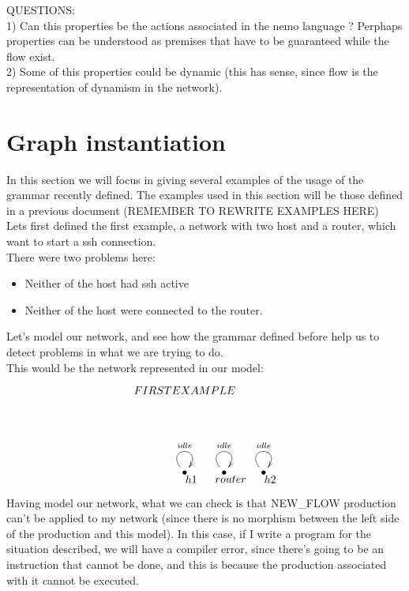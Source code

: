 \documentclass[envcountsect,runningheads]{llncs}
\begin{document}
\begin{itemize}
  QUESTIONS:\\
  1) Can this properties be the actions associated in the nemo language ? 
  Perphaps properties can be understood as premises that have to be guaranteed 
  while the flow exist. \\
  2) Some of this properties could be dynamic (this has sense, since flow is the representation 
  of dynamism in the network). \\
    
\end{itemize} 

\section{Graph instantiation}

In this section we will focus in giving several examples of the usage of the 
grammar recently defined. The examples used in this section will be those defined in 
a previous document (REMEMBER TO REWRITE EXAMPLES HERE) \\ 
Lets first defined the first example, a network with two host and a router, 
which want to start a ssh connection. \\
There were two problems here:
\begin{itemize}
  \item Neither of the host had ssh active
  \item Neither of the host were connected to the router.
\end{itemize}

Let's model our network, and see how the grammar defined before help us to 
detect problems in what we are trying to do.\\
This would be the network represented in our model:
\begin{figure}[H]
    \[
       \xymatrix@C=25pt@R=30pt
       {
         {}\POS[]-<0pc,0pc>\drop{FIRST EXAMPLE}
         \\
         \\
         {\bullet}\ar@(ul,ur)^{idle} \POS[]-<-.5pc,.5pc> \drop{h1} &
         {\bullet}\ar@(ul,ur)^{idle} \POS[]-<-.5pc,.5pc> \drop{router} &
         {\bullet}\ar@(ul,ur)^{idle} \POS[]-<-.5pc,.5pc> \drop{h2}
      }
    \]
\end{figure}

Having model our network, what we can check is that NEW\_FLOW production can't be 
applied to my network (since there is no morphism between the left side of the production 
and this model). In this case, if I write a program for the situation described, 
we will have a compiler error, since there's going to be an instruction that 
cannot be done, and this is because the production associated with it cannot be 
executed.
\end{document}
